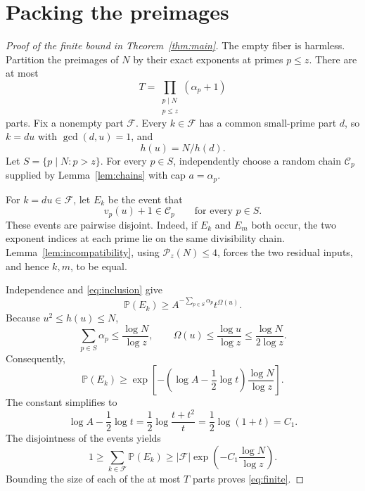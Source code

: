 \documentclass[11pt,a4paper]{article}
\theoremstyle{remark}\newtheorem*{remark}{Remark}
\newcommand{\PP}{\mathbb P}
\newcommand{\FF}{\mathcal F}
\begin{document}
\section{Packing the preimages}
\begin{proof}[Proof of the finite bound in Theorem~\ref{thm:main}]
The empty fiber is harmless. Partition the preimages of $N$ by their exact exponents at primes $p\le z$. There are at most
\[
T=\prod_{\substack{p\mid N\\p\le z}}(\alpha_p+1)
\]
parts. Fix a nonempty part $\FF$. Every $k\in\FF$ has a common small-prime part $d$, so $k=du$ with $\gcd(d,u)=1$, and
\[
h(u)=N/h(d).
\]
Let $S=\{p\mid N:p>z\}$. For every $p\in S$, independently choose a random chain $\mathcal C_p$ supplied by Lemma~\ref{lem:chains} with cap $a=\alpha_p$.

For $k=du\in\FF$, let $E_k$ be the event that
\[
v_p(u)+1\in\mathcal C_p\qquad\text{for every }p\in S.
\]
These events are pairwise disjoint. Indeed, if $E_k$ and $E_m$ both occur, the two exponent indices at each prime lie on the same divisibility chain. Lemma~\ref{lem:incompatibility}, using $\mathcal P_z(N)\le4$, forces the two residual inputs, and hence $k,m$, to be equal.

Independence and \eqref{eq:inclusion} give
\[
\PP(E_k)\ge A^{-\sum_{p\in S}\alpha_p}t^{\Omega(u)}.
\]
Because $u^2\le h(u)\le N$,
\[
\sum_{p\in S}\alpha_p\le\frac{\log N}{\log z},
\qquad
\Omega(u)\le\frac{\log u}{\log z}\le\frac{\log N}{2\log z}.
\]
Consequently,
\[
\PP(E_k)\ge\exp\!\left[-\left(\log A-\frac12\log t\right)
\frac{\log N}{\log z}\right].
\]
The constant simplifies to
\[
\log A-\frac12\log t
=\frac12\log\frac{t+t^2}{t}
=\frac12\log(1+t)=C_1.
\]
The disjointness of the events yields
\[
1\ge\sum_{k\in\FF}\PP(E_k)
\ge |\FF|\exp\!\left(-C_1\frac{\log N}{\log z}\right).
\]
Bounding the size of each of the at most $T$ parts proves \eqref{eq:finite}.
\end{proof}
\end{document}
